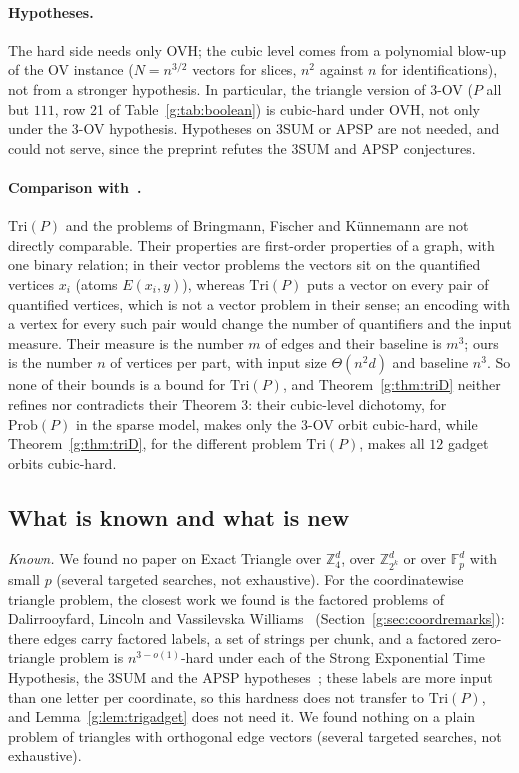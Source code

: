 \documentclass[11pt]{article}
\theoremstyle{definition}
\theoremstyle{remark}
\newcommand{\Z}{\mathbb{Z}}
\newcommand{\Fp}{\mathbb{F}_p}
\newcommand{\Prob}{\mathrm{Prob}}
\begin{document}
\paragraph{Hypotheses.} The hard side needs only OVH; the cubic level comes from a polynomial blow-up of the OV instance ($N=n^{3/2}$ vectors for slices, $n^2$ against $n$ for identifications), not from a stronger hypothesis. In particular, the triangle version of $3$-OV ($P$ all but $111$, row 21 of Table~\ref{g:tab:boolean}) is cubic-hard under OVH, not only under the $3$-OV hypothesis. Hypotheses on 3SUM or APSP are not needed, and could not serve, since the preprint refutes the 3SUM and APSP conjectures.

\paragraph{Comparison with~\cite{BFK19}.} $\mathrm{Tri}(P)$ and the problems of Bringmann, Fischer and Künnemann are not directly comparable. Their properties are first-order properties of a graph, with one binary relation; in their vector problems the vectors sit on the quantified vertices $x_i$ (atoms $E(x_i,y)$), whereas $\mathrm{Tri}(P)$ puts a vector on every pair of quantified vertices, which is not a vector problem in their sense; an encoding with a vertex for every such pair would change the number of quantifiers and the input measure. Their measure is the number $m$ of edges and their baseline is $m^3$; ours is the number $n$ of vertices per part, with input size $\Theta(n^2d)$ and baseline $n^3$. So none of their bounds is a bound for $\mathrm{Tri}(P)$, and Theorem~\ref{g:thm:triD} neither refines nor contradicts their Theorem 3: their cubic-level dichotomy, for $\Prob(P)$ in the sparse model, makes only the $3$-OV orbit cubic-hard, while Theorem~\ref{g:thm:triD}, for the different problem $\mathrm{Tri}(P)$, makes all $12$ gadget orbits cubic-hard.

\subsection{What is known and what is new}\label{g:sec:triremarks}

\emph{Known.} We found no paper on Exact Triangle over $\Z_4^d$, over $\Z_{2^k}^d$ or over $\Fp^d$ with small $p$ (several targeted searches, not exhaustive). For the coordinatewise triangle problem, the closest work we found is the factored problems of Dalirrooyfard, Lincoln and Vassilevska Williams~\cite{DLW20} (Section~\ref{g:sec:coordremarks}): there edges carry factored labels, a set of strings per chunk, and a factored zero-triangle problem is $n^{3-o(1)}$-hard under each of the Strong Exponential Time Hypothesis, the 3SUM and the APSP hypotheses~\cite[Theorem~1.2]{DLW20}; these labels are more input than one letter per coordinate, so this hardness does not transfer to $\mathrm{Tri}(P)$, and Lemma~\ref{g:lem:trigadget} does not need it. We found nothing on a plain problem of triangles with orthogonal edge vectors (several targeted searches, not exhaustive).
\end{document}
